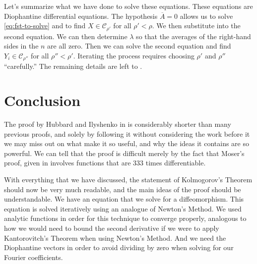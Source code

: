 \documentclass[twoside,letterpaper,11pt]{article}
\numberwithin{equation}{section}
\begin{document}
Let's summarize what we have done to solve these equations.
These equations are Diophantine differential equations.
The hypothesis $\overline{A} = 0$ allows us to solve \cref{eq:fst-to-solve} and
to find $X \in \mathcal{C}_{\rho'}$ for all $\rho' < \rho$.
We then substitute into the second equation.
We can then determine $\lambda$ so that the averages of the right-hand sides in
the $n$ are all zero.
Then we can solve the second equation and find $Y_i \in \mathcal{C}_{\rho''}$
for all $\rho'' < \rho'$.
Iterating the process requires choosing $\rho'$ and $\rho''$ ``carefully.''
The remaining details are left to \cite{hi02}.

\section{Conclusion}
\label{sec:conclusion}

The proof by Hubbard and Ilyshenko in \cite{hi02} is considerably shorter than
many previous proofs, and solely by following it without considering the work
before it we may miss out on what make it so useful, and why the ideas it
contains are so powerful.
We can tell that the proof is difficult merely by the fact that Moser's proof,
given in involves functions that are $333$ times differentiable.

With everything that we have discussed, the statement of Kolmogorov's Theorem
should now be very much readable, and the main ideas of the proof should be
understandable.
We have an equation that we solve for a diffeomorphism.
This equation is solved iteratively using an analogue of Newton's Method.
We used analytic functions in order for this technique to converge properly,
analogous to how we would need to bound the second derivative if we were to
apply Kantorovitch's Theorem when using Newton's Method.
And we need the Diophantine vectors in order to avoid dividing by zero when
solving for our Fourier coefficients.

\nocite{*}


\end{document}
